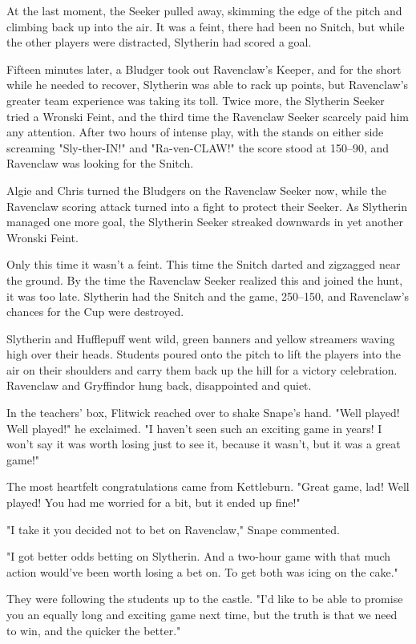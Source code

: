 At the last moment, the Seeker pulled away, skimming the edge of the pitch and climbing back up into the air. It was a feint, there had been no Snitch, but while the other players were distracted, Slytherin had scored a goal.

Fifteen minutes later, a Bludger took out Ravenclaw's Keeper, and for the short while he needed to recover, Slytherin was able to rack up points, but Ravenclaw's greater team experience was taking its toll. Twice more, the Slytherin Seeker tried a Wronski Feint, and the third time the Ravenclaw Seeker scarcely paid him any attention. After two hours of intense play, with the stands on either side screaming "Sly-ther-IN!" and "Ra-ven-CLAW!" the score stood at 150--90, and Ravenclaw was looking for the Snitch.

Algie and Chris turned the Bludgers on the Ravenclaw Seeker now, while the Ravenclaw scoring attack turned into a fight to protect their Seeker. As Slytherin managed one more goal, the Slytherin Seeker streaked downwards in yet another Wronski Feint.

Only this time it wasn't a feint. This time the Snitch darted and zigzagged near the ground. By the time the Ravenclaw Seeker realized this and joined the hunt, it was too late. Slytherin had the Snitch and the game, 250--150, and Ravenclaw's chances for the Cup were destroyed.

Slytherin and Hufflepuff went wild, green banners and yellow streamers waving high over their heads. Students poured onto the pitch to lift the players into the air on their shoulders and carry them back up the hill for a victory celebration. Ravenclaw and Gryffindor hung back, disappointed and quiet.

In the teachers' box, Flitwick reached over to shake Snape's hand. "Well played! Well played!" he exclaimed. "I haven't seen such an exciting game in years! I won't say it was worth losing just to see it, because it wasn't, but it was a great game!"

The most heartfelt congratulations came from Kettleburn. "Great game, lad! Well played! You had me worried for a bit, but it ended up fine!"

"I take it you decided not to bet on Ravenclaw," Snape commented.

"I got better odds betting on Slytherin. And a two-hour game with that much action would've been worth losing a bet on. To get both was icing on the cake."

They were following the students up to the castle. "I'd like to be able to promise you an equally long and exciting game next time, but the truth is that we need to win, and the quicker the better."

